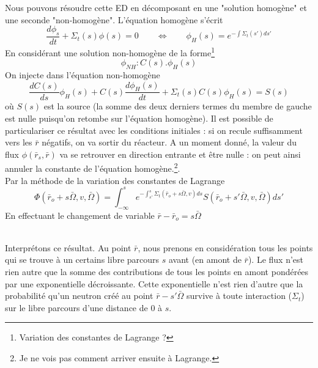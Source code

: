 Nous pouvons résoudre cette ED en décomposant en une "solution homogène" et une seconde "non-homogène". 
L'équation homogène s'écrit
\begin{equation}
\dfrac{d\phi_s}{dt}+\Sigma_t(s)\phi(s) = 0\qquad\Leftrightarrow\qquad\phi_H(s) = e^{-\int \Sigma_t(s')ds'}
\end{equation}
En considérant une solution non-homogène de la forme\footnote{Variation des constantes de Lagrange ?}
\begin{equation}
\phi_{NH} : C(s).\phi_H(s)
\end{equation}
On injecte dans l'équation non-homogène
\begin{equation}
\frac{dC(s)}{ds}\phi_H(s)+C(s)\frac{d\phi_H(s)}{dt} + \Sigma_t(s)C(s)\phi_H(s) = S(s)
\end{equation}
où $S(s)$ est la source (la somme des deux derniers termes du membre de gauche est nulle puisqu'on retombe sur l'équation homogène). Il est possible de 
particulariser ce résultat avec les conditions initiales : si on recule suffisamment vers les 
$\bar r$ négatifs, on va sortir du réacteur. A un moment donné, la valeur du flux 
$\phi(\bar r_s, \bar r)$ va se retrouver en direction entrante et être nulle : on peut ainsi 
annuler la constante de l'équation homogène.\footnote{Je ne vois pas comment arriver ensuite à Lagrange.}. \\

Par la méthode de la variation des constantes de Lagrange
\begin{equation}
\varPhi ({\bar r_o} + s\bar \Omega ,v,\bar \Omega ) = \int_{ - \infty }^s {  {e^{ - \int_{s'}^s    {\Sigma _t}({{\bar r}_o} + s\bar \Omega ,v)ds}}} S({\bar r_o} + s'\bar \Omega ,v,\bar \Omega )ds'
\end{equation}
En effectuant le changement de variable $\bar r - {\bar r_o} = s\bar \Omega $

\ \\

Interprétons ce résultat. Au point $\bar r$, nous prenons en considération tous les points qui se 
trouve à un certains libre parcours $s$ avant (en amont de $\bar r$). Le flux n'est rien autre que la somme 
des contributions de tous les points en amont pondérées par une exponentielle décroissante. Cette exponentielle n'est 
rien d'autre que la probabilité qu'un neutron créé au point $\bar r - s'\bar \Omega$ survive à toute interaction ($\Sigma_t$)
sur le libre parcours d'une distance de 0 à $s$.\\

